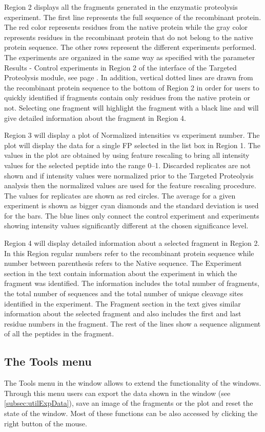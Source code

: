 Region \num{2} displays all the fragments generated in the enzymatic proteolysis experiment. The first line represents the full sequence of the recombinant protein. The red color represents residues from the native protein while the gray color represents residues in the recombinant protein that do not belong to the native protein sequence. The other rows represent the different experiments performed. The experiments are organized in the same way as specified with the parameter Results - Control experiments in Region \num{2} of the interface of the Targeted Proteolysis module, see page \pageref{par:tarprotResultControl}. In addition, vertical dotted lines are drawn from the recombinant protein sequence to the bottom of Region \num{2} in order for users to quickly identified if fragments contain only residues from the native protein or not. Selecting one fragment will highlight the fragment with a black line and will give detailed information about the fragment in Region \num{4}. 

Region \num{3} will display a plot of Normalized intensities vs experiment number. The plot will display the data for a single FP selected in the list box in Region \num{1}. The values in the plot are obtained by using feature rescaling to bring all intensity values for the selected peptide into the range \numrange{0}{1}. Discarded replicates are not shown and if intensity values were normalized prior to the Targeted Proteolysis analysis then the normalized values are used for the feature rescaling procedure. The values for replicates are shown as red circles. The average for a given experiment is shown as bigger cyan diamonds and the standard deviation is used for the bars. The blue lines only connect the control experiment and experiments showing intensity values significantly different at the chosen significance level.  

Region \num{4} will display detailed information about a selected fragment in Region \num{2}. In this Region regular numbers refer to the recombinant protein sequence while number between parenthesis refers to the Native sequence. The Experiment section in the text contain information about the experiment in which the fragment was identified. The information includes the total number of fragments, the total number of sequences and the total number of unique cleavage sites identified in the experiment. The Fragment section in the text gives similar information about the selected fragment and also includes the first and last residue numbers in the fragment. The rest of the lines show a sequence alignment of all the peptides in the fragment.

\subsection{The Tools menu}

The Tools menu in the window allows to extend the functionality of the windows. Through this menu users can export the data shown in the window (see \autoref{subsec:utilExpData}), save an image of the fragments or the plot and reset the state of the window. Most of these functions can be also accessed by clicking the right button of the mouse.